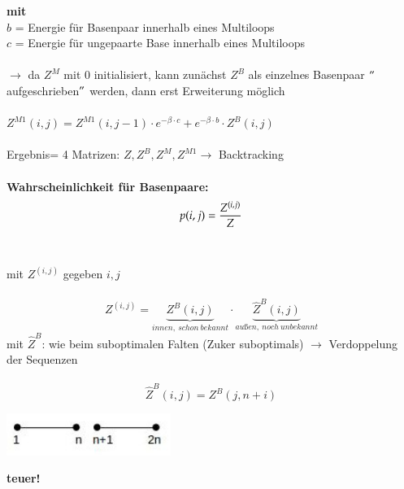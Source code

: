 \textbf{mit}\\
$b$ = Energie für Basenpaar innerhalb eines Multiloops\\
$c$ = Energie für ungepaarte Base innerhalb eines Multiloops
\\\\
$\rightarrow$ da $Z^M$ mit 0 initialisiert, kann zunächst $Z^B$ als einzelnes Basenpaar $"$aufgeschrieben$"$ werden, dann erst Erweiterung möglich
\\\\
$Z^{M1}(i,j) = Z^{M1}(i, j-1) \cdot e^{-\beta \cdot c} + e^{-\beta \cdot b} \cdot Z^B(i,j) $
\\\\
Ergebnis= 4 Matrizen: $Z, Z^B, Z^M, Z^{M1} \rightarrow$ Backtracking
\\\\
\textbf{Wahrscheinlichkeit für Basenpaare:}
\begin{equation}
	p(i,j) = {Z^{(i,j)} \over Z}
\end{equation}
\\\\
mit $Z^{(i,j)}$ gegeben $i,j$
\\\\
\begin{equation}
	Z^{(i,j)}=\underbrace{Z^B(i,j)}_{innen,~schon~bekannt} \cdot \underbrace{\widehat{Z}^B(i,j)}_{außen,~noch~unbekannt}
\end{equation}
mit $\widehat{Z}^B$: wie beim suboptimalen Falten (Zuker suboptimals) $\rightarrow$ Verdoppelung der Sequenzen
\\\\
\begin{equation}
	\widehat{Z}^B(i,j)= Z^B(j, n+i)
\end{equation}
\begin{center}
	\includegraphics[width=0.4\textwidth]{lectures/160425/pix/1.jpg}
\end{center}
\textbf{teuer!}

\newpage

